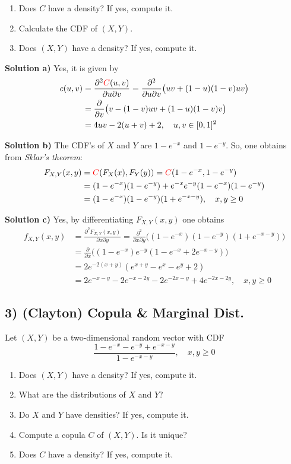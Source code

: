 \begin{enumerate}[label=(\alph*)]
    \item Does $C$ have a density? If yes, compute it.
    \item Calculate the CDF of $(X, Y)$.
    \item Does $(X,Y)$ have a density? If yes, compute it.
\end{enumerate}

\textbf{Solution a)} Yes, it is given by
\begin{align*}
    c(u,v) &= \frac{\partial^2 \textcolor{red}{C}(u,v)}{\partial u \partial v} = \frac{\partial^2}{\partial u \partial v}\big(uv + (1-u)(1-v)uv\big) \\
    &= \frac{\partial}{\partial v}\big( v - (1-v)uv + (1-u)(1-v)v\big) \\
    &= 4uv - 2(u+v) + 2, \quad u,v\in[0,1]^2
\end{align*}

\textbf{Solution b)} The CDF's of $X$ and $Y$ are $1-e^{-x}$ and $1-e^{-y}$. So, one obtains from \textit{Sklar's theorem}:
\begin{align*}
    F_{X,Y}(x,y) &= \textcolor{red}{C}(F_X(x), F_Y(y)) = \textcolor{red}{C}(1 - e^{-x}, 1 - e^{-y}) \\
    &= (1 - e^{-x})(1 - e^{-y}) + e^{-x}e^{-y}(1 - e^{-x})(1 - e^{-y}) \\
    &= (1 - e^{-x})(1 - e^{-y})(1 + e^{-x-y}), \quad x,y\geq 0
\end{align*}

\textbf{Solution c)} Yes, by differentiating $F_{X,Y}(x,y)$ one obtains
\begin{align*}
    f_{X,Y}(x,y) &= \frac{\partial^2 F_{X,Y}(x,y)}{\partial x\partial y} = \frac{\partial^2}{\partial x\partial y}\big((1-e^{-x})(1-e^{-y})(1 + e^{-x-y})\big) \\
    &= \frac{\partial}{\partial x} \big((1-e^{-x})e^{-y}(1 - e^{-x} + 2e^{-x-y})\big) \\
    &= 2e^{-2(x+y)}(e^{x+y} - e^x - e^y + 2) \\
    &= 2e^{-x-y} - 2e^{-x-2y} - 2e^{-2x-y} + 4 e^{-2x-2y}, \quad x,y\geq 0
\end{align*}

%
%
\subsection*{3) (Clayton) Copula \& Marginal Dist.}
Let $(X,Y)$ be a two-dimensional random vector with CDF
\[
    \frac{1-e^{-x}-e^{-y}+e^{-x-y}}{1-e^{-x-y}}, \quad x,y\geq 0
\]
\begin{enumerate}[label=(\alph*)]
    \item Does $(X,Y)$ have a density? If yes, compute it.
    \item What are the distributions of $X$ and $Y$?
    \item Do $X$ and $Y$ have densities? If yes, compute it.
    \item Compute a copula $C$ of $(X,Y)$. Is it unique?
    \item Does $C$ have a density? If yes, compute it.
\end{enumerate}

